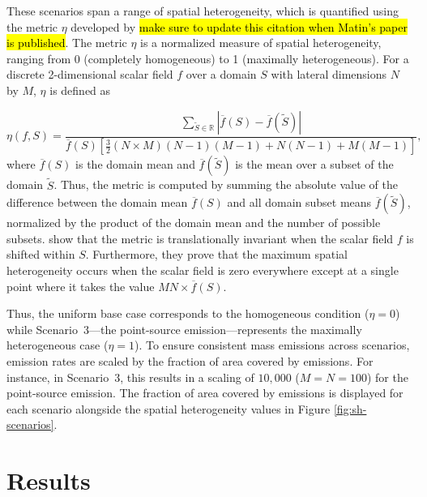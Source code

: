 \documentclass[journal abbreviation, manuscript]{copernicus}
\begin{document}
These scenarios span a range of spatial heterogeneity, which is
quantified using the metric $\eta$ developed by
\citep{mohebalhojeh_2024} \hl{make sure to update this citation when
  Matin's paper is published}. The metric $\eta$ is a normalized
measure of spatial heterogeneity, ranging from 0 (completely
homogeneous) to 1 (maximally heterogeneous). For a discrete
2-dimensional scalar field $f$ over a domain $S$ with lateral
dimensions $N$ by $M$, $\eta$ is defined as

\begin{equation}
\eta(f, S) = \frac{\sum_{\tilde{S}\in \mathbb{R}}|\overline{f}(S) - \overline{f}(\tilde{S})|}{\overline{f}(S)\left[\frac{3}{2}(N\times M)(N-1)(M-1) + N(N-1) + M(M-1)\right]}, 
\end{equation}
where $\overline{f}(S)$ is the domain mean and
$\overline{f}(\tilde{S})$ is the mean over a subset of the domain
$\tilde{S}$. Thus, the metric is computed by summing the absolute
value of the difference between the domain mean $\overline{f}(S)$ and
all domain subset means $\overline{f}(\tilde{S})$, normalized by the
product of the domain mean and the number of possible
subsets. \citet{mohebalhojeh_2024} show that the metric is
translationally invariant when the scalar field $f$ is shifted within
$S$. Furthermore, they prove that the
maximum spatial heterogeneity occurs when the
scalar field is zero everywhere except at a single point
where it takes the value $MN\times\overline{f}(S)$.

Thus, the uniform base case corresponds to the homogeneous condition
($\eta = 0$) while Scenario~3---the point-source
emission---represents the maximally heterogeneous case ($\eta =
1$). To ensure consistent mass emissions across scenarios, emission
rates are scaled by the fraction of area covered by emissions. For
instance, in Scenario~3, this results in a scaling of $10,000$
($M=N=100$) for the point-source emission. The fraction of area
covered by emissions is displayed for each scenario alongside the
spatial heterogeneity values in Figure \ref{fig:sh-scenarios}.

\section{Results}\label{results}
\end{document}
